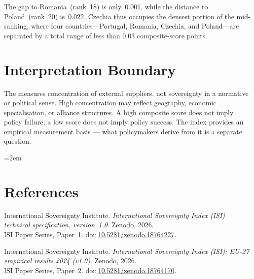 \documentclass[12pt,a4paper]{article}
\begin{document}
The gap to Romania~(rank~18) is only~0.001, while the distance to Poland~(rank~20) is~0.022.  Czechia thus occupies the densest portion of the mid-ranking, where four countries---Portugal, Romania, Czechia, and Poland---are separated by a total range of less than 0.03 composite-score points.


\section{Interpretation Boundary}
\label{sec:interpretation}

The \ISI measures concentration of external suppliers, not sovereignty in a normative or political sense.  High concentration may reflect geography, economic specialisation, or alliance structures.  A high composite score does not imply policy failure; a low score does not imply policy success.  The index provides an empirical measurement basis --- what policymakers derive from it is a separate question.


\clearpage
\vspace*{1.5cm}

\begingroup\emergencystretch=2em
\section*{References}

\begin{enumerate}[label={[\arabic*]},leftmargin=2em,itemsep=6pt]
\item International Sovereignty Institute.
  \textit{International Sovereignty Index (ISI) technical specification, version~1.0}.
  Zenodo, 2026.\\ISI Paper Series, Paper~1.
  doi:\,\href{https://doi.org/10.5281/zenodo.18764227}{10.5281/zenodo.18764227}.

\item International Sovereignty Institute.
  \textit{International Sovereignty Index (ISI): EU-27 empirical results 2024 (v1.0)}.
  Zenodo, 2026.\\ISI Paper Series, Paper~2.
  doi:\,\href{https://doi.org/10.5281/zenodo.18764170}{10.5281/zenodo.18764170}.
\end{enumerate}
\endgroup
\end{document}
